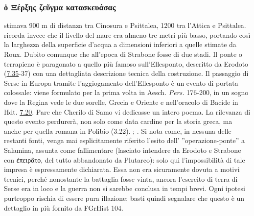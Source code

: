 {\subsubsection{\textgreek{ὁ Ξέρξης ζεῦγμα κατασκευάσας}}\label{bkm:RefHeading696921501267828}
\cite[61]{Roux1974} stimava 900 m di distanza tra Cinosura e Psittalea, 1200 tra l'Attica e Psittalea. \cite[294]{Wallace1969} ricorda invece che il livello del mare era almeno tre metri più basso, portando così la larghezza della superficie d'acqua a dimensioni inferiori a quelle stimate da Roux. Dubito comunque che all'epoca di Strabone fosse di due stadi. Il ponte o terrapieno è paragonato a quello più famoso sull'Ellesponto, descritto da Erodoto (\href{http://data.perseus.org/citations/urn:cts:greekLit:tlg0016.tlg001.perseus-grc1:7.35}{7.35}-37) con una dettagliata descrizione tecnica della costruzione. Il passaggio di Serse in Europa tramite l'aggiogamento dell'Ellesponto è un evento di portata colossale: viene formulato per la prima volta in Aesch. \emph{Pers.} 176-200, in un sogno dove la Regina vede le due sorelle, Grecia e  Oriente e nell'oracolo di Bacide in Hdt. \href{http://data.perseus.org/citations/urn:cts:greekLit:tlg0016.tlg001.perseus-grc1:7.20}{7.20}. Pare che Cherilo di Samo vi dedicasse un intero poema. La rilevanza di questo evento perdurerà, non solo come data cardine per la storia greca, ma anche per quella romana in Polibio  (3.22). \cite[90-91]{Mazzarino1947}; \cite[7]{Pelling1997}.
Si nota come, in nessuna delle restanti fonti, venga mai esplicitamente riferito l'esito dell' ''operazione-ponte'' a Salamina, assunta come fallimentare (lasciato intendere da Erodoto e Strabone con \textgreek{ἐπειρᾶτο}, del tutto abbandonato da Plutarco): solo qui l'impossibilità di tale impresa è espressamente dichiarata. Essa non era sicuramente dovuta a motivi tecnici, perché nonostante la battaglia fosse vinta, ancora l'esercito di terra di Serse era in loco e la guerra non si sarebbe conclusa in tempi brevi. Ogni ipotesi purtroppo rischia di essere pura illazione; basti quindi segnalare che questo è un dettaglio in più fornito da FGrHist 104. 
}
